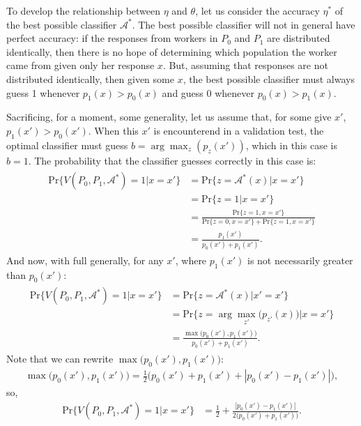 \documentclass[12pt]{article}
\begin{document}
To develop the relationship between $\eta$ and $\theta$, let us consider
the accuracy $\eta^*$ of the best possible classifier $\mathcal{A}^*$.
The best possible classifier will not in general have perfect accuracy:
if the responses from workers in $P_0$ and $P_1$ are distributed 
identically, then there is no hope of determining which population the worker 
came from given only her response $x$.  But, assuming that responses are
not distributed identically, then given some $x$, the best possible 
classifier must always guess 1 whenever $p_1(x) > p_0(x)$ and guess 0 whenever
$p_0(x) > p_1(x)$.

Sacrificing, for a moment, some generality, let us assume that, for some give 
$x'$, $p_1(x') > p_0(x')$.  
When this $x'$ is encounterend in a validation test, the optimal classifier
must guess $b = \arg\!\max_{z}(p_{z}(x'))$, which in this case is $b=1$.
The probability that the classifier guesses correctly in this case is:
\begin{align}
	\begin{split}
	\mathrm{Pr}\{V(P_0, P_1, \mathcal{A}^*) = 1 | x = x' \} 
		&= \mathrm{Pr}\{z = \mathcal{A^*}(x) | x = x' \} \\
		&= \mathrm{Pr}\{z = 1 | x = x' \}  \\
		&= \frac{\mathrm{Pr}\{z = 1 , x = x'\}}
			{ \mathrm{Pr}\{z=0 , x=x'\} + \mathrm{Pr}\{z=1 , x=x'\}} \\
		&= \frac{p_1(x')}{p_0(x') + p_1(x')}.
	\end{split}
\end{align}
And now, with full generally, for any $x'$, where $p_1(x')$ is not necessarily
greater than $p_0(x')$:
\begin{align}
	\begin{split}
		\mathrm{Pr}\{V(P_0,P_1,\mathcal{A}^*)=1 | x = x' \} 
		&= \mathrm{Pr}\{z=\mathcal{A^*}(x)  | x' = x' \} \\
		&= \mathrm{Pr}\{z = \arg\!\max_{z'}\big(p_{z'}(x)\big)| x = x' \}  \\
		&= \frac{\max\big( p_0(x'),p_1(x') \big)}
		{ p_0(x') + p_1(x') }.
	\end{split}
\end{align}
Note that we can rewrite $\max\big(p_0(x'),p_1(x')\big)$:
\begin{align}
	\max\big(p_0(x'),p_1(x')\big) = \frac{1}{2}
		\big(
			p_0(x') + p_1(x') + |p_0(x') - p_1(x')|
		\big),
\end{align}
so,
\begin{align}
	\mathrm{Pr}\{V(P_0,P_1,\mathcal{A}^*) = 1 | x = x' \} 
	&= \frac{1}{2} + \frac{|p_0(x') - p_1(x')|}{2 \big(p_0(x') + p_1(x') \big)}.
\end{align}
\end{document}
